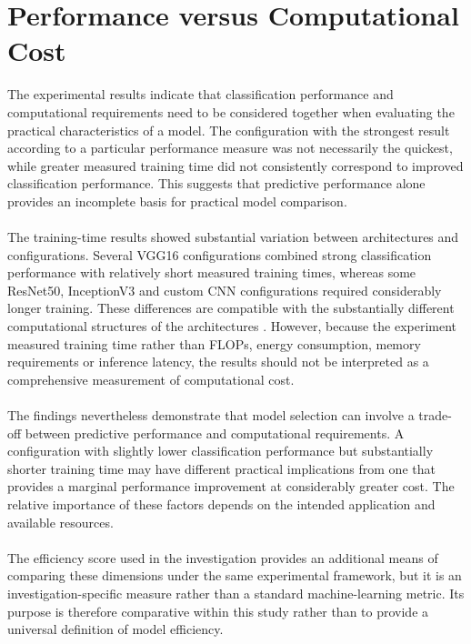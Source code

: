 \documentclass[12pt, a4paper]{report}
\let\oldsection\section
\renewcommand{\section}{%
    \Needspace{6\baselineskip}%
    \oldsection
}
\begin{document}
		\section{Performance versus Computational Cost}
			
			The experimental results indicate that classification performance and computational requirements need to be considered together when evaluating the practical characteristics of a model. The configuration with the strongest result according to a particular performance measure was not necessarily the quickest, while greater measured training time did not consistently correspond to improved classification performance. This suggests that predictive performance alone provides an incomplete basis for practical model comparison.\\\\
			The training-time results showed substantial variation between architectures and configurations. Several VGG16 configurations combined strong classification performance with relatively short measured training times, whereas some ResNet50, InceptionV3 and custom CNN configurations required considerably longer training. These differences are compatible with the substantially different computational structures of the architectures \cite{simonyan2015vgg, he2016resnet, szegedy2016inception}. However, because the experiment measured training time rather than FLOPs, energy consumption, memory requirements or inference latency, the results should not be interpreted as a comprehensive measurement of computational cost.\\\\
			The findings nevertheless demonstrate that model selection can involve a trade-off between predictive performance and computational requirements. A configuration with slightly lower classification performance but substantially shorter training time may have different practical implications from one that provides a marginal performance improvement at considerably greater cost. The relative importance of these factors depends on the intended application and available resources.\\\\
			The efficiency score used in the investigation provides an additional means of comparing these dimensions under the same experimental framework, but it is an investigation-specific measure rather than a standard machine-learning metric. Its purpose is therefore comparative within this study rather than to provide a universal definition of model efficiency.
			
\end{document}
